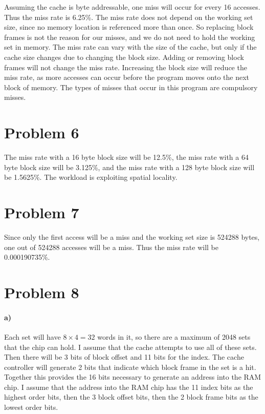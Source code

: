 \documentclass[12pt]{article}
\begin{document}
Assuming the cache is byte addressable, one miss will occur for every 16 accesses. Thus the miss rate is 6.25\%.
The miss rate does not depend on the working set size, since no memory location is referenced more than once. So replacing
block frames is not the reason for our misses, and we do not need to hold the working set in memory. The miss rate can
vary with the size of the cache, but only if the cache size changes due to changing the block size. Adding or removing
block frames will not change the miss rate. Increasing the block size will reduce the miss rate, as more accesses can occur
before the program moves onto the next block of memory. The types of misses that occur in this program are compulsory misses.

\section*{Problem 6}

The miss rate with a 16 byte block size will be 12.5\%, the miss rate with a 64 byte block size will be 3.125\%, and the miss rate with a
128 byte block size will be 1.5625\%. The workload is exploiting spatial locality.

\section*{Problem 7}

Since only the first access will be a miss and the working set size is 524288 bytes, one out of 524288 accesses will be a miss. Thus the
miss rate will be 0.000190735\%.

\section*{Problem 8}

\paragraph{a)}

Each set will have \(8\times 4=32\) words in it, so there are a maximum of 2048 sets that the chip can hold. I assume that the cache attempts to
use all of these sets. Then there will be 3 bits of block offset and 11 bits for the index. The cache controller will generate 2 bits that indicate
which block frame in the set is a hit. Together this provides the 16 bits necessary to generate an address into the RAM chip. I assume that the address
into the RAM chip has the 11 index bits as the highest order bits, then the 3 block offset bits, then the 2 block frame bits as the lowest order bits.
\end{document}
